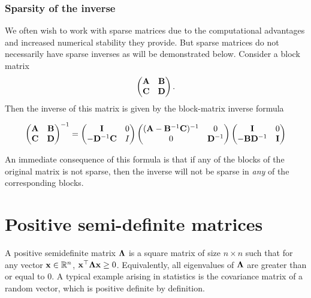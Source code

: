 \documentclass{amsart}[12pt]
\begin{document}
\subsubsection{Sparsity of the inverse}
We often wish to work with sparse matrices due to the computational advantages and increased numerical
stability they provide. But sparse matrices do not necessarily have sparse inverses as will be demonstrated
below. Consider a block matrix
\[
	\begin{pmatrix}
		{\bf A} & {\bf B} \\
		{\bf C} & {\bf D}
	\end{pmatrix}.
\]
Then the inverse of this matrix is given by the block-matrix inverse formula

\[
	\begin{pmatrix}
	{\bf A} & {\bf B} \\
	{\bf C} & {\bf D}
	\end{pmatrix}^{-1}
	=
	\begin{pmatrix}
	{\bf I} & 0 \\
	-{\bf D}^{-1} {\bf C} & I
	\end{pmatrix}
	\begin{pmatrix}
	({\bf A} - {\bf B}^{-1}{\bf C})^{-1} & 0 \\
	0 & {\bf D}^{-1}
	\end{pmatrix}
	\begin{pmatrix}
	{\bf I} & 0 \\
	-{\bf B}{\bf D}^{-1} & {\bf I}
	\end{pmatrix}
\]

An immediate consequence of this formula is that if any of the blocks of the original matrix is not sparse,
then the inverse will not be sparse in \emph{any} of the corresponding blocks.

\section{Positive semi-definite matrices}
A positive semidefinite matrix ${\boldsymbol \Lambda}$ is a square matrix of size $n \times n$ such that for any vector
${\bf x} \in {\mathbb{R}}^n$, ${\bf x}^\top {\boldsymbol\Lambda} {\bf x} \geq 0$. Equivalently, all eigenvalues of ${\boldsymbol \Lambda}$ are greater than or 
equal to 0. A typical example arising in statistics is the covariance matrix of a random vector, which is
positive definite by definition.
\end{document}
